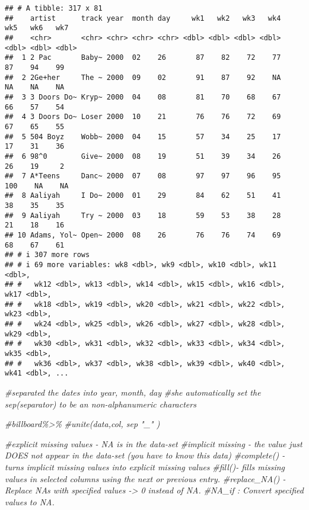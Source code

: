 \documentclass[
]{article}
\newenvironment{Shaded}{\begin{snugshade}}{\end{snugshade}}
\newcommand{\CommentTok}[1]{\textcolor[rgb]{0.56,0.35,0.01}{\textit{#1}}}
\begin{document}
\begin{verbatim}
## # A tibble: 317 x 81
##    artist      track year  month day     wk1   wk2   wk3   wk4   wk5   wk6   wk7
##    <chr>       <chr> <chr> <chr> <chr> <dbl> <dbl> <dbl> <dbl> <dbl> <dbl> <dbl>
##  1 2 Pac       Baby~ 2000  02    26       87    82    72    77    87    94    99
##  2 2Ge+her     The ~ 2000  09    02       91    87    92    NA    NA    NA    NA
##  3 3 Doors Do~ Kryp~ 2000  04    08       81    70    68    67    66    57    54
##  4 3 Doors Do~ Loser 2000  10    21       76    76    72    69    67    65    55
##  5 504 Boyz    Wobb~ 2000  04    15       57    34    25    17    17    31    36
##  6 98^0        Give~ 2000  08    19       51    39    34    26    26    19     2
##  7 A*Teens     Danc~ 2000  07    08       97    97    96    95   100    NA    NA
##  8 Aaliyah     I Do~ 2000  01    29       84    62    51    41    38    35    35
##  9 Aaliyah     Try ~ 2000  03    18       59    53    38    28    21    18    16
## 10 Adams, Yol~ Open~ 2000  08    26       76    76    74    69    68    67    61
## # i 307 more rows
## # i 69 more variables: wk8 <dbl>, wk9 <dbl>, wk10 <dbl>, wk11 <dbl>,
## #   wk12 <dbl>, wk13 <dbl>, wk14 <dbl>, wk15 <dbl>, wk16 <dbl>, wk17 <dbl>,
## #   wk18 <dbl>, wk19 <dbl>, wk20 <dbl>, wk21 <dbl>, wk22 <dbl>, wk23 <dbl>,
## #   wk24 <dbl>, wk25 <dbl>, wk26 <dbl>, wk27 <dbl>, wk28 <dbl>, wk29 <dbl>,
## #   wk30 <dbl>, wk31 <dbl>, wk32 <dbl>, wk33 <dbl>, wk34 <dbl>, wk35 <dbl>,
## #   wk36 <dbl>, wk37 <dbl>, wk38 <dbl>, wk39 <dbl>, wk40 <dbl>, wk41 <dbl>, ...
\end{verbatim}

\begin{Shaded}
\begin{Highlighting}[]
\CommentTok{\#separated the dates into year, month, day}
\CommentTok{\#she automatically set the sep(separator) to be an non{-}alphanumeric characters}
\end{Highlighting}
\end{Shaded}

\begin{Shaded}
\begin{Highlighting}[]
\CommentTok{\#billboard\%\textgreater{}\%}
\CommentTok{\#unite(data,col, sep "\_" )}
\end{Highlighting}
\end{Shaded}

\begin{Shaded}
\begin{Highlighting}[]
\CommentTok{\#explicit missing values {-} NA is in the data{-}set}
\CommentTok{\#implicit missing {-} the value just DOES not appear in the data{-}set (you have to know this data)}
\CommentTok{\#complete() {-} turns implicit missing values into explicit missing values }
\CommentTok{\#fill(){-} fills missing values in selected columns using the next or previous entry. }
\CommentTok{\#replace\_NA() {-} Replace NA\textquotesingle{}s with specified values  {-}\textgreater{} 0 instead of NA.}
\CommentTok{\#NA\_if : Convert specified values to NA. }
\end{Highlighting}
\end{Shaded}
\end{document}
